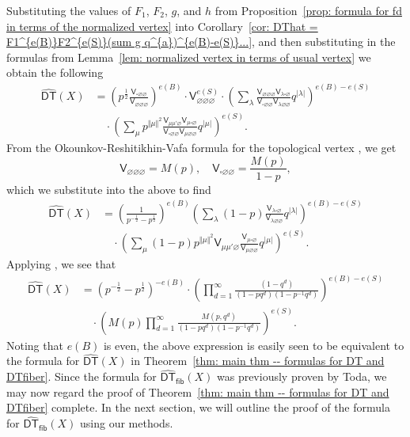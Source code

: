\documentclass[12pt]{amsart}
\theoremstyle{definition}
\newcommand{\sfV}{\mathsf{V}}
\newcommand{\DT}{\mathsf{DT}}
\renewcommand{\emptyset}{\varnothing}
\newcommand{\DThat}{\widehat{\DT}}
\newcommand{\fiber}{\mathsf{fib}}
\newcommand{\half}{\frac{1}{2}}
\newcommand{\bx}{\square}
\begin{document}
Substituting the values of $F_{1}$, $F_{2}$, $g$, and $h$ from
Proposition~\ref{prop: formula for fd in terms of the normalized
vertex} into Corollary~\ref{cor: DThat = F1^{e(B)}F2^{e(S)}(sum g
q^{a})^{e(B)-e(S)}...}, and then substituting in the formulas from
Lemma~\ref{lem: normalized vertex in terms of usual vertex} we obtain
the following
\begin{align*}
\DThat (X) & = \left(p^{\half}\frac{\sfV_{\bx \emptyset
\emptyset}}{\sfV_{\emptyset \emptyset \emptyset}} \right)^{e(B)}\cdot
\sfV_{\emptyset \emptyset \emptyset }^{e(S)} \cdot
\left(\sum_{\lambda} \frac{\sfV_{\emptyset \emptyset \emptyset }
\sfV_{\lambda \bx \emptyset}}{\sfV_{\bx \emptyset
\emptyset}\sfV_{\lambda \emptyset \emptyset}}q^{|\lambda |}
\right)^{e(B)-e(S)}\\
&\quad \cdot \left(\sum_{\mu} p^{\Vert \mu \Vert^{2}} \frac{\sfV_{\mu \mu'
\emptyset} \sfV_{\mu \bx \emptyset}}{\sfV_{\bx \emptyset
\emptyset}\sfV_{\mu \emptyset \emptyset}}q^{|\mu |} \right)^{e(S)}.
\end{align*}
From the Okounkov-Reshitikhin-Vafa formula for the topological vertex
\cite{Ok-Re-Va}, \cite[eqn~(5)]{Bryan-Kool-Young} we get
\[
\sfV_{\emptyset \emptyset \emptyset} =M(p),\quad \sfV_{\bx \emptyset
\emptyset} = \frac{M(p)}{1-p},
\]
which we substitute into the above to find
\begin{align*}
\DThat (X) &= \left(\frac{1}{p^{-\half}-p^{\half}} \right)^{e(B)}
\left(\sum_{\lambda} (1-p)\frac{\sfV_{\lambda \bx
\emptyset}}{\sfV_{\lambda \emptyset \emptyset}} q^{|\lambda
|}\right)^{e(B)-e(S)} \\
&\quad \cdot \left(\sum_{\mu} (1-p)p^{\Vert \mu \Vert^{2}} \sfV_{\mu \mu'
\emptyset}\frac{\sfV_{\mu \bx \emptyset}}{\sfV_{\mu \emptyset
\emptyset}}q^{|\mu |} \right)^{e(S)}.
\end{align*}
Applying \cite[eqns~(2)\&(4)]{Bryan-Kool-Young}, we see that 
\begin{align*}
\DThat (X) &=\left(p^{-\half}-p^{\half} \right)^{-e(B)} \cdot
\left(\prod_{d=1}^{\infty} \frac{(1-q^{d})}{(1-pq^{d})(1-p^{-1}q^{d})} \right)^{e(B)-e(S)}\\
&\quad \cdot \left(M(p) \prod_{d=1}^{\infty}
\frac{M(p,q^{d})}{(1-pq^{d})(1-p^{-1}q^{d})} \right)^{e(S)} .
\end{align*}
Noting that $e(B)$ is even, the above expression is easily seen to be
equivalent to the formula for $\DThat (X)$ in Theorem~\ref{thm: main
thm -- formulas for DT and DTfiber}. Since the formula for
$\DThat_{\fiber}(X)$ was previously proven by Toda, we may now regard
the proof of Theorem~\ref{thm: main thm -- formulas for DT and
DTfiber} complete. In the next section, we will outline the proof of
the formula for $\DThat_{\fiber}(X)$ using our methods.
\end{document}
